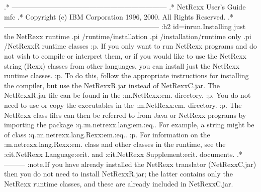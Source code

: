 .* ------------------------------------------------------------------
.* NetRexx User's Guide                                              mfc
.* Copyright (c) IBM Corporation 1996, 2000.  All Rights Reserved.
.* ------------------------------------------------------------------
:h2 id=inrun.Installing just the NetRexx runtime
.pi /runtime/installation
.pi /installation/runtime only
.pi /NetRexxR runtime classes
:p.
If you only want to run NetRexx programs and do not wish to compile or
interpret them, or if you would like to use the NetRexx string (Rexx)
classes from other languages, you can install just the NetRexx runtime
classes.
:p.
To do this, follow the appropriate instructions for installing the
compiler, but use the NetRexxR.jar instead of NetRexxC.jar.
The NetRexxR.jar file can be found in the :m.NetRexx\runlib:em. directory.
:p.
You do not need to use or copy the executables in the :m.NetRexx\bin:em.
directory.
:p.
The NetRexx class files can then be referred to from Java or NetRexx
programs by importing the package :q.:m.netrexx.lang:em.:eq..  For
example, a string might be of class :q.:m.netrexx.lang.Rexx:em.:eq..
:p.
For information on the :m.netrexx.lang.Rexx:em. class and other classes
in the runtime, see the :cit.NetRexx Language:ecit. and :cit.NetRexx
Supplement:ecit. documents.
.* ---------
:note.If you have already installed the NetRexx translator
(NetRexxC.jar) then you do not need to install NetRexxR.jar; the latter
contains only the NetRexx runtime classes, and these are already
included in NetRexxC.jar.
